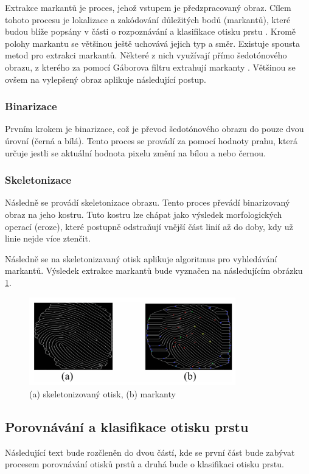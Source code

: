 Extrakce markantů je proces, jehož vstupem je předzpracovaný obraz. Cílem tohoto procesu je lokalizace a zakódování důležitých bodů (markantů), které budou blíže popsány v části o rozpoznávání a klasifikace otisku prstu \cite{fingerprintOverview}. Kromě polohy markantu se většinou ještě uchovává jejich typ a směr. Existuje spousta metod pro extrakci markantů. Některé z nich využívají přímo šedotónového obrazu, z kterého za pomocí Gáborova filtru extrahují markanty \cite{ZHAO20071270}. Většinou se ovšem na vylepšený obraz aplikuje následující postup.

\subsubsection{Binarizace}
Prvním krokem je binarizace, což je převod šedotónového obrazu do pouze dvou úrovní (černá a bílá). Tento proces se provádí za pomocí hodnoty prahu, která určuje jestli se aktuální hodnota pixelu změní na bílou a nebo černou. 

\subsubsection{Skeletonizace}
Následně se provádí skeletonizace obrazu. Tento proces převádí binarizovaný obraz na jeho kostru. Tuto kostru lze chápat jako výsledek morfologických operací (eroze), které postupně odstraňují vnější část linií až do doby, kdy už linie nejde více ztenčit.

Následně se na skeletonizavaný otisk aplikuje algoritmus pro vyhledávání markantů. Výsledek extrakce markantů bude vyznačen na následujícím obrázku \ref{finger_preprocessing2}.

\newpage
\begin{figure}[h]
	\centering
	\includegraphics[width=0.8\textwidth]{obrazky/finger_markant.png}
	\caption{ (a) skeletonizovaný otisk, (b) markanty \cite{fingerprintOverview}}
	\label{finger_preprocessing2}
\end{figure}


\subsection{Porovnávání a klasifikace otisku prstu}
\label{Porovnávání a klasifikace otisku prstu}
Následující text bude rozčleněn do dvou částí, kde se první část bude zabývat procesem porovnávání otisků prstů a druhá bude o klasifikaci otisku prstu.


